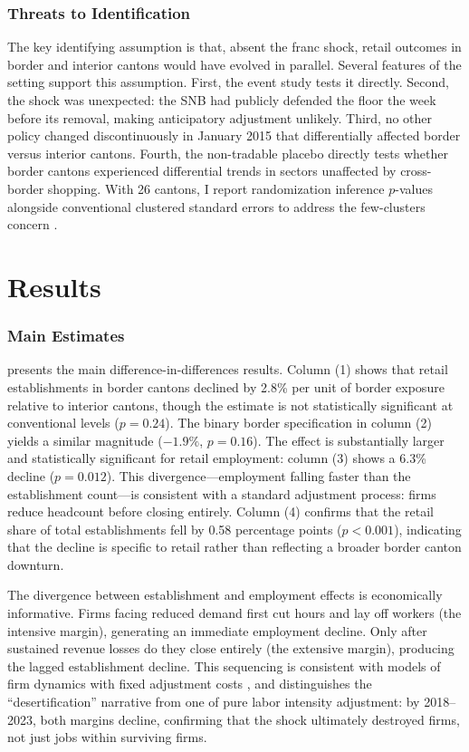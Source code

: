 \documentclass[12pt]{article}
\begin{document}
\subsubsection*{Threats to Identification} The key identifying assumption is that, absent the franc shock, retail outcomes in border and interior cantons would have evolved in parallel. Several features of the setting support this assumption. First, the event study tests it directly. Second, the shock was unexpected: the SNB had publicly defended the floor the week before its removal, making anticipatory adjustment unlikely. Third, no other policy changed discontinuously in January 2015 that differentially affected border versus interior cantons. Fourth, the non-tradable placebo directly tests whether border cantons experienced differential trends in sectors unaffected by cross-border shopping. With 26 cantons, I report randomization inference $p$-values alongside conventional clustered standard errors to address the few-clusters concern \citep{Canay2017}.

\section{Results}

\subsubsection*{Main Estimates}  presents the main difference-in-differences results. Column (1) shows that retail establishments in border cantons declined by 2.8\% per unit of border exposure relative to interior cantons, though the estimate is not statistically significant at conventional levels ($p = 0.24$). The binary border specification in column (2) yields a similar magnitude ($-1.9\%$, $p = 0.16$). The effect is substantially larger and statistically significant for retail employment: column (3) shows a 6.3\% decline ($p = 0.012$). This divergence---employment falling faster than the establishment count---is consistent with a standard adjustment process: firms reduce headcount before closing entirely. Column (4) confirms that the retail share of total establishments fell by 0.58 percentage points ($p < 0.001$), indicating that the decline is specific to retail rather than reflecting a broader border canton downturn.



The divergence between establishment and employment effects is economically informative. Firms facing reduced demand first cut hours and lay off workers (the intensive margin), generating an immediate employment decline. Only after sustained revenue losses do they close entirely (the extensive margin), producing the lagged establishment decline. This sequencing is consistent with models of firm dynamics with fixed adjustment costs \citep{Campbell2005, Haltiwanger2013}, and distinguishes the ``desertification'' narrative from one of pure labor intensity adjustment: by 2018--2023, both margins decline, confirming that the shock ultimately destroyed firms, not just jobs within surviving firms.
\end{document}
